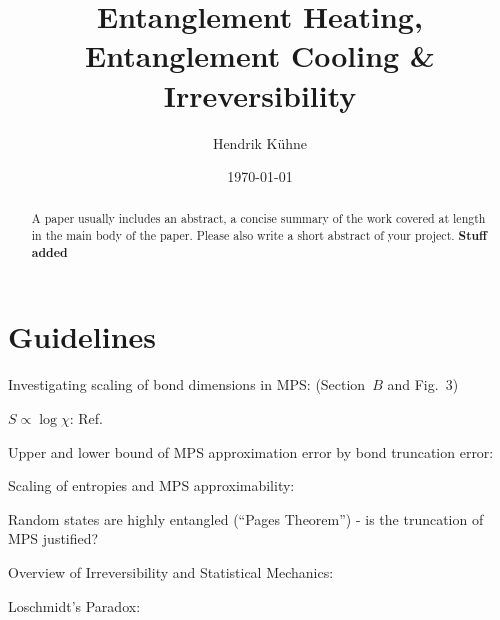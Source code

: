 \documentclass[reprint,amsmath,amssymb,aps,prb]{revtex4-2}
\begin{document}
    \title{Entanglement Heating, Entanglement Cooling \& Irreversibility}
    \author{Hendrik Kühne}
    \date{\today}

    \begin{abstract}
        A paper usually includes an abstract, a concise summary of the work covered at length in the main body of the paper. Please also write a short abstract of your project.
        \textbf{Stuff added}
    \end{abstract}

    \maketitle

    \section{Guidelines}

    \cite{Shaffer:2014:IrreversibilityAndEntanglement,Jizba:2004:MultifractalThermodynamics,Chamon:2014:EmergentIrreversibility,Odavic:2023:RandomUnitaries}

    Investigating scaling of bond dimensions in MPS: \cite{Pirvu:2012:FiniteSizeVersusFiniteEntanglement} (Section~$B$
    and Fig.~3)

    $S\propto\log\chi$: Ref.~\cite{Pollmann:2009:FiniteEntanglementScaling}

    Upper and lower bound of MPS approximation error by bond truncation error: \cite{Verstraete:2006:faithfulMPS}

    Scaling of entropies and MPS approximability: \cite{Schuch:2008:EntropyScaling}

    Random states are highly entangled (``Pages Theorem'') \cite{Page:1993:AverageEntropy} - is the truncation of MPS justified?

    Overview of Irreversibility and Statistical Mechanics: \cite{Haar:1955:FoundationsStatisticalMechanics}

    Loschmidt's Paradox: \cite{Loschmidt:1876:LoschmidtParadox}

    

    \appendix
\end{document}
